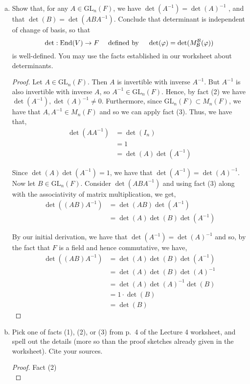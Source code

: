\documentclass[11pt, reqno]{amsart}
\theoremstyle{plain}
\theoremstyle{definition}
\theoremstyle{example}
\def\GL{\mathrm{GL}} \def\SL{\mathrm{SL}}  \def\SP{\mathrm{SL}}
\def\End{\mathrm{End}}
\def\sgn{\mathrm{sgn}}
\def\f{\varphi}
\begin{document}
\begin{enumerate}[1.]
\begin{enumerate}[(a)]
\begin{proof}
Hence, in the definition of the determinant, we have,
\begin{align*}
\det((\alpha_{i,j})) &= \sum_{\sigma \in S_n} \sgn(\sigma) \alpha_{1,\sigma(1)}\alpha_{2,\sigma(2)} \cdots \alpha_{i, \sigma(i)} \cdots \alpha_{n,\sigma(n)}\\
&= \sum_{\sigma \in S_n} \sgn(\sigma) \alpha_{1,\sigma(1)}\alpha_{2,\sigma(2)} \cdots 0 \cdots \alpha_{n,\sigma(n)}\\
&= 0
\end{align*}

as required.
\end{proof}
\item Show that, for any $A \in \GL_n(F)$, we have $\det(A^{-1}) = \det(A)^{-1}$ , and that $\det(B) = \det(A B A^{-1})$. Conclude that determinant is independent of change of basis, so that 
$$\det: \End(V) \to F \quad \text{ defined by } \quad \det(\f) = \det(M_\cB^\cB(\f))$$
is well-defined. You may use the facts established in our worksheet about determinants.
\begin{proof}
Let $A \in \GL_n(F)$. Then $A$ is invertible with inverse $A^{-1}$. But $A^{-1}$ is also invertible with inverse $A$, so $A^{-1} \in \GL_n(F)$. Hence, by fact (2) we have $\det(A^{-1}), \det(A)^{-1} \neq 0$. Furthermore, since $\GL_n(F) \subset M_n(F)$, we have that $A, A^{-1} \in M_n(F)$ and so we can apply fact (3). Thus, we have that,
\begin{align*}
\det(AA^{-1}) &= \det(I_n)\\
&= 1\\
&= \det(A)\det(A^{-1})
\end{align*}

Since $\det(A)\det(A^{-1}) = 1$, we have that $\det(A^{-1}) = \det(A)^{-1}$.\\

Now let $B \in \GL_n(F)$. Consider $\det(ABA^{-1})$ and using fact (3) along with the associativity of matrix multiplication, we get,
\begin{align*}
\det((AB)A^{-1}) &= \det(AB)\det(A^{-1})\\
&= \det(A)\det(B)\det(A^{-1})
\end{align*}

By our initial derivation, we have that $\det(A^{-1}) = \det(A)^{-1}$ and so, by the fact that $F$ is a field and hence commutative, we have,
\begin{align*}
\det((AB)A^{-1}) &= \det(A)\det(B)\det(A^{-1})\\
&= \det(A)\det(B)\det(A)^{-1}\\
&= \det(A)\det(A)^{-1}\det(B)\\
&= 1 \cdot \det(B)\\
&= \det(B)
\end{align*}
\end{proof}
\item Pick one of facts (1), (2), or (3) from p.\ 4 of the Lecture 4 worksheet, and spell out the details (more so than the proof sketches already given in the worksheet). Cite your sources. 
\begin{proof}
Fact (2)\\


\end{proof}
\end{enumerate}
\end{enumerate}
\end{document}
